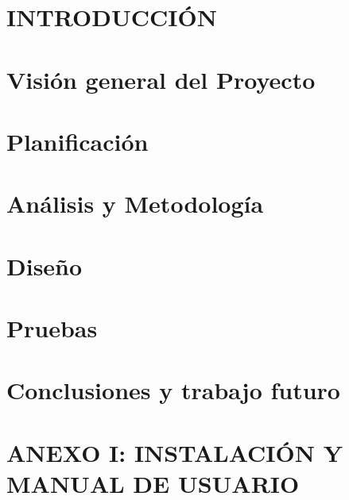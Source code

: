 \documentclass[b5paper,10pt,twoside]{book}
\begin{document}
	\listoffigures
	
	\listoftables
	

	\chapter{INTRODUCCIÓN}
	
	
	
	\chapter{Visión general del Proyecto}

	
	
	\chapter{Planificación}
	
	
	
	\chapter{Análisis y Metodología}
	
	
	
	\chapter{Diseño}
	
	
	
	\chapter{Pruebas}
	
	
	
	\chapter{Conclusiones y trabajo futuro}
	
	
	
	\chapter{ANEXO I: INSTALACIÓN Y MANUAL DE USUARIO }
		
	
		
	
		
	
\end{document}
